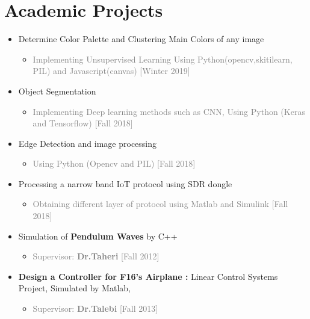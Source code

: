 \documentclass[10pt,a4paper,sans]{moderncv} %
\begin{document}


\section{Academic Projects}

\begin{itemize}
\item Determine Color Palette and Clustering Main Colors of any image
\begin{itemize}
\item \textcolor{gray}{Implementing Unsupervised Learning Using Python(opencv,skitilearn, PIL) and Javascript(canvas) [Winter 2019]}
\end{itemize}
\item Object Segmentation 
\begin{itemize}
\item \textcolor{gray}{Implementing Deep learning methods such as CNN, Using Python (Keras and Tensorflow) [Fall 2018]}
\end{itemize}
\item Edge Detection and image processing
\begin{itemize}
\item \textcolor{gray}{Using Python (Opencv and PIL) [Fall 2018]}
\end{itemize}
\item Processing a narrow band IoT protocol using SDR dongle \begin{itemize}
\item \textcolor{gray}{Obtaining different layer of protocol using Matlab and Simulink [Fall 2018]}
\end{itemize}

\item Simulation of \textbf{Pendulum Waves} by C++
\begin{itemize}
\item \textcolor{gray}{Supervisor: \textbf{Dr.Taheri} [Fall 2012]}
\end{itemize}

\item \textbf{Design a Controller for F16's Airplane :} Linear Control Systems Project, Simulated by
Matlab, 
\begin{itemize}
\item \textcolor{gray}{Supervisor: \textbf{Dr.Talebi} [Fall 2013]}
\end{itemize}


\end{itemize}
\end{document}
